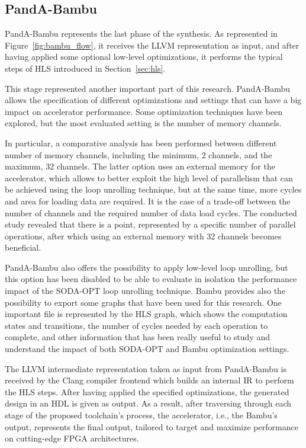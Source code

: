 \subsection{PandA-Bambu}
\label{subsec:toolchain-panda_bambu}%

PandA-Bambu represents the last phase of the synthesis.
As represented in Figure~\ref{fig:bambu_flow}, it receives the LLVM representation as input, and after having applied some optional low-level optimizations, it performs the typical steps of HLS introduced in Section~\ref{sec:hls}.

This stage represented another important part of this research.
PandA-Bambu allows the specification of different optimizations and settings that can have a big impact on accelerator performance.
Some optimization techniques have been explored, but the most evaluated setting is the number of memory channels.

In particular, a comparative analysis has been performed between different number of memory channels, including the minimum, 2 channels, and the maximum, 32 channels.
The latter option uses an external memory for the accelerator, which allows to better exploit the high level of parallelism that can be achieved using the loop unrolling technique, but at the same time, more cycles and area for loading data are required.
It is the case of a trade-off between the number of channels and the required number of data load cycles.
The conducted study revealed that there is a point, represented by a specific number of parallel operations, after which using an external memory with 32 channels becomes beneficial.

PandA-Bambu also offers the possibility to apply low-level loop unrolling, but this option has been disabled to be able to evaluate in isolation the performance impact of the SODA-OPT loop unrolling technique.
Bambu provides also the possibility to export some graphs that have been used for this research.
One important file is represented by the HLS graph, which shows the computation states and transitions, the number of cycles needed by each operation to complete, and other information that has been really useful to study and understand the impact of both SODA-OPT and Bambu optimization settings.

The LLVM intermediate representation taken as input from PandA-Bambu is received by the Clang compiler frontend which builds an internal IR to perform the HLS steps.
After having applied the specified optimizations, the generated design in an HDL is given as output.
As a result, after traversing through each stage of the proposed toolchain's process, the accelerator, i.e., the Bambu's output, represents the final output, tailored to target and maximize performance on cutting-edge FPGA architectures.

